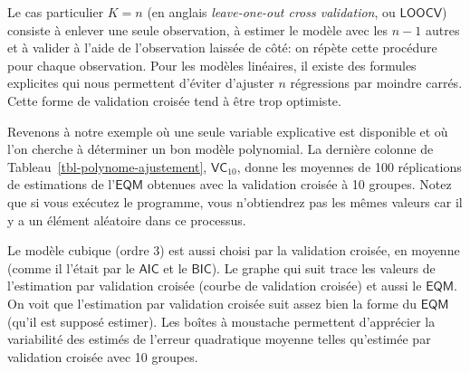 \documentclass[
  11pt,
  letterpaper,
]{book}
\newenvironment{Shaded}{\begin{snugshade}}{\end{snugshade}}
\newcommand{\AttributeTok}[1]{\textcolor[rgb]{0.40,0.45,0.13}{#1}}
\newcommand{\CommentTok}[1]{\textcolor[rgb]{0.37,0.37,0.37}{#1}}
\newcommand{\DecValTok}[1]{\textcolor[rgb]{0.68,0.00,0.00}{#1}}
\newcommand{\FunctionTok}[1]{\textcolor[rgb]{0.28,0.35,0.67}{#1}}
\newcommand{\NormalTok}[1]{\textcolor[rgb]{0.00,0.23,0.31}{#1}}
\newcommand{\OtherTok}[1]{\textcolor[rgb]{0.00,0.23,0.31}{#1}}
\newcommand{\SpecialCharTok}[1]{\textcolor[rgb]{0.37,0.37,0.37}{#1}}
\newcommand{\StringTok}[1]{\textcolor[rgb]{0.13,0.47,0.30}{#1}}
\theoremstyle{definition}
\theoremstyle{remark}
\begin{document}
\begin{Shaded}
\end{Shaded}

Le cas particulier \(K=n\) (en anglais \emph{leave-one-out cross
validation}, ou \(\mathsf{LOOCV}\)) consiste à enlever une seule
observation, à estimer le modèle avec les \(n-1\) autres et à valider à
l'aide de l'observation laissée de côté: on répète cette procédure pour
chaque observation. Pour les modèles linéaires, il existe des formules
explicites qui nous permettent d'éviter d'ajuster \(n\) régressions par
moindre carrés. Cette forme de validation croisée tend à être trop
optimiste.

Revenons à notre exemple où une seule variable explicative est
disponible et où l'on cherche à déterminer un bon modèle polynomial. La
dernière colonne de Tableau~\ref{tbl-polynome-ajustement},
\(\mathsf{VC}_{10}\), donne les moyennes de 100 réplications de
estimations de l'\(\mathsf{EQM}\) obtenues avec la validation croisée à
10 groupes. Notez que si vous exécutez le programme, vous n'obtiendrez
pas les mêmes valeurs car il y a un élément aléatoire dans ce processus.

Le modèle cubique (ordre 3) est aussi choisi par la validation croisée,
en moyenne (comme il l'était par le \(\mathsf{AIC}\) et le
\(\mathsf{BIC}\)). Le graphe qui suit trace les valeurs de l'estimation
par validation croisée (courbe de validation croisée) et aussi le
\(\mathsf{EQM}\). On voit que l'estimation par validation croisée suit
assez bien la forme du \(\mathsf{EQM}\) (qu'il est supposé estimer). Les
boîtes à moustache permettent d'apprécier la variabilité des estimés de
l'erreur quadratique moyenne telles qu'estimée par validation croisée
avec 10 groupes.
\end{document}
